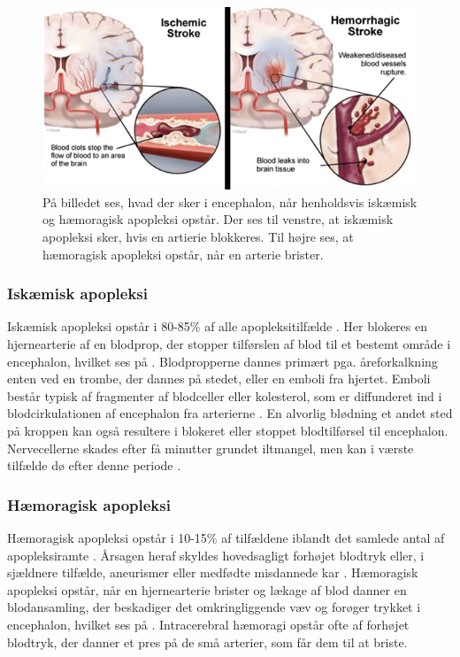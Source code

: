 \begin{figure}[H]
	\centering
	\includegraphics[scale=0.8]{figures/bProblemanalyse/haemoragisk_og_iskaemisk.png}
	\caption{På billedet ses, hvad der sker i encephalon, når henholdsvis iskæmisk og hæmoragisk apopleksi opstår. Der ses til venstre, at iskæmisk apopleksi sker, hvis en artierie blokkeres. Til højre ses, at hæmoragisk apopleksi opstår, når en arterie brister. \cite{Ritter2015}}
	\label{haem-isk}
\end{figure}

\subsubsection{Iskæmisk apopleksi}\label{IskaemiskApp}
Iskæmisk apopleksi opstår i 80-85\% af alle apopleksitilfælde \cite{Sundhed.dk2014}. Her blokeres en hjernearterie af en blodprop, der stopper tilførslen af blod til et bestemt område i encephalon, hvilket ses på . Blodpropperne dannes primært pga. åreforkalkning enten ved en trombe, der dannes på stedet, eller en emboli fra hjertet. \cite{Schulze2011} Emboli består typisk af fragmenter af blodceller eller kolesterol, som er diffunderet ind i blodcirkulationen af encephalon fra arterierne \cite{Academic2015a}. En alvorlig blødning et andet sted på kroppen kan også resultere i blokeret eller stoppet blodtilførsel til encephalon. \cite{Hjernesagen2015a} Nervecellerne skades efter få minutter grundet iltmangel, men kan i værste tilfælde dø efter denne periode \cite{Schulze2011,Giraldo2015}.%

\subsubsection{Hæmoragisk apopleksi}
Hæmoragisk apopleksi opstår i 10-15\% af tilfældene iblandt det samlede antal af apopleksiramte \cite{Sundhed.dk2014}. Årsagen heraf skyldes hovedsagligt forhøjet blodtryk eller, i sjældnere tilfælde, aneurismer eller medfødte misdannede kar \cite{Schulze2011}. Hæmoragisk apopleksi opstår, når en hjernearterie brister og lækage af blod danner en blodansamling, der beskadiger det omkringliggende væv og forøger trykket i encephalon, hvilket ses på . Intracerebral hæmoragi opstår ofte af forhøjet blodtryk, der danner et pres på de små arterier, som får dem til at briste. \cite{Caplan2006}

